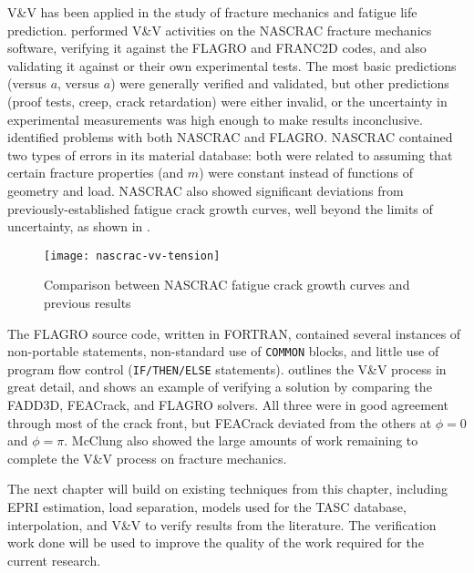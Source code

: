 V\&V has been applied in the study of fracture mechanics and fatigue life prediction.
\citet{favanesi1994} performed V\&V activities on the NASCRAC fracture mechanics software, verifying it against the FLAGRO and FRANC2D codes, and also validating it against \citet{tadaparisirwin1973} or their own experimental tests.
The most basic predictions (\K versus \(a\), \J versus \(a\)) were generally verified and validated, but other predictions (proof tests, creep, crack retardation) were either invalid, or the uncertainty in experimental measurements was high enough to make results inconclusive.
\citet{wilson1995} identified problems with both NASCRAC and FLAGRO.
NASCRAC contained two types of errors in its material database: both were related to assuming that certain fracture properties (\Kc and \(m\)) were constant instead of functions of geometry and load.
NASCRAC also showed significant deviations from previously-established fatigue crack growth curves, well beyond the limits of uncertainty, as shown in .
\begin{figure}
\centering
\texttt{[image: nascrac-vv-tension]}
\caption[Comparison between NASCRAC fatigue crack growth curves and previous results]{\label{fig:nascrac-vv-tension} Comparison between NASCRAC fatigue crack growth curves and previous results \citep{wilson1995}}
\end{figure}
The FLAGRO source code, written in FORTRAN, contained several instances of non-portable statements, non-standard use of \verb|COMMON| blocks, and little use of program flow control (\verb|IF/THEN/ELSE| statements).
\citet{mcclung2012} outlines the V\&V process in great detail, and shows an example of verifying a \K solution by comparing the FADD3D, FEACrack, and FLAGRO solvers.
All three were in good agreement through most of the crack front, but FEACrack deviated from the others at \(\phi=0\) and \(\phi=\pi\).
McClung also showed the large amounts of work remaining to complete the V\&V process on fracture mechanics.

The next chapter will build on existing techniques from this chapter, including EPRI estimation, load separation, models used for the TASC database, interpolation, and V\&V to verify results from the literature.
The verification work done will be used to improve the quality of the work required for the current research. 
